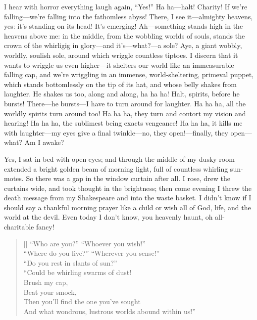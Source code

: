 \documentclass[12pt,a4paper]{article}
\begin{document}
I hear with horror everything laugh again, “Yes!” Ha ha—halt! Charity! If we’re falling—we’re falling into the fathomless abyss! There, I see it—almighty heavens, yes: it’s standing on its head! It’s emerging! Ah—something stands high in the heavens above me: in the middle, from the wobbling worlds of souls, stands the crown of the whirligig in glory—and it’s—what?—a sole? Aye, a giant wobbly, worldly, soulish sole, around which wriggle countless tiptoes. I discern that it wants to wriggle us even higher—it shelters our world like an immeasurable falling cap, and we’re wriggling in an immense, world-sheltering, primeval puppet, which stands bottomlessly on the tip of its hat, and whose belly shakes from laughter. He shakes us too, along and along, ha ha ha! Halt, spirits, before he bursts! There—he bursts—I have to turn around for laughter. Ha ha ha, all the worldly spirits turn around too! Ha ha ha, they turn and contort my vision and hearing! Ha ha ha, the sublimest being exacts vengeance! Ha ha ha, it kills me with laughter—my eyes give a final twinkle—no, they open!—finally, they open—what? Am I awake?

Yes, I sat in bed with open eyes; and through the middle of my dusky room extended a bright golden beam of morning light, full of countless whirling sun-motes. So there was a gap in the window curtain after all. I rose, drew the curtains wide, and took thought in the brightness; then come evening I threw the death message from my Shakespeare and into the waste basket. I didn’t know if I should say a thankful morning prayer like a child or wish all of God, life, and the world at the devil. Even today I don’t know, you heavenly haunt, oh all-charitable fancy!
\settowidth{\versewidth}{And what wondrous, lustrous worlds abound within us!”}
\begin{verse}[\versewidth]
“Who are you?” “Whoever you wish!” \\
“Where do you live?” “Wherever you sense!” \\
“Do you rest in slants of sun?” \\
“Could be whirling swarms of dust! \\
Brush my cap, \\
Beat your smock, \\
Then you’ll find the one you’ve sought \\
And what wondrous, lustrous worlds abound within us!”
\end{verse}
\end{document}
